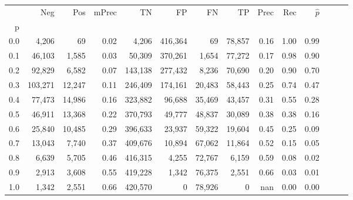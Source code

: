 \begin{tabular}{rrrrrrrrrrrrrr}
\toprule
{} &      Neg &     Pos & mPrec &       TN &       FP &      FN &      TP &  Prec &   Rec & $\hat{p}$ \\
p   &          &         &       &          &          &         &         &       &       &           \\
\midrule
0.0 &    4,206 &      69 &  0.02 &    4,206 &  416,364 &      69 &  78,857 &  0.16 &  1.00 &      0.99 \\
0.1 &   46,103 &   1,585 &  0.03 &   50,309 &  370,261 &   1,654 &  77,272 &  0.17 &  0.98 &      0.90 \\
0.2 &   92,829 &   6,582 &  0.07 &  143,138 &  277,432 &   8,236 &  70,690 &  0.20 &  0.90 &      0.70 \\
0.3 &  103,271 &  12,247 &  0.11 &  246,409 &  174,161 &  20,483 &  58,443 &  0.25 &  0.74 &      0.47 \\
0.4 &   77,473 &  14,986 &  0.16 &  323,882 &   96,688 &  35,469 &  43,457 &  0.31 &  0.55 &      0.28 \\
0.5 &   46,911 &  13,368 &  0.22 &  370,793 &   49,777 &  48,837 &  30,089 &  0.38 &  0.38 &      0.16 \\
0.6 &   25,840 &  10,485 &  0.29 &  396,633 &   23,937 &  59,322 &  19,604 &  0.45 &  0.25 &      0.09 \\
0.7 &   13,043 &   7,740 &  0.37 &  409,676 &   10,894 &  67,062 &  11,864 &  0.52 &  0.15 &      0.05 \\
0.8 &    6,639 &   5,705 &  0.46 &  416,315 &    4,255 &  72,767 &   6,159 &  0.59 &  0.08 &      0.02 \\
0.9 &    2,913 &   3,608 &  0.55 &  419,228 &    1,342 &  76,375 &   2,551 &  0.66 &  0.03 &      0.01 \\
1.0 &    1,342 &   2,551 &  0.66 &  420,570 &        0 &  78,926 &       0 &   nan &  0.00 &      0.00 \\
\bottomrule
\end{tabular}
